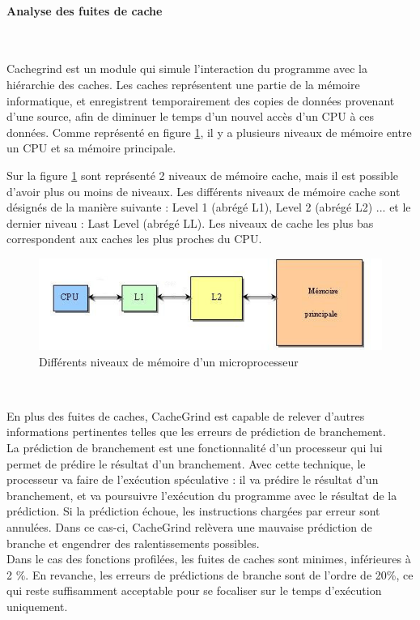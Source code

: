 \documentclass[10pt]{report}
\begin{document}
\paragraph{Analyse des fuites de cache}~\par
Cachegrind est un module qui simule l'interaction du programme avec la hiérarchie des caches. Les caches représentent une partie de la mémoire informatique, et enregistrent temporairement des copies de données provenant d'une source, afin de diminuer le temps d'un nouvel accès d'un CPU à ces données. Comme représenté en figure \ref{Différents niveaux de mémoire d'un microprocesseur}, il y a plusieurs niveaux de mémoire entre un CPU et sa mémoire principale. 

Sur la figure \ref{Différents niveaux de mémoire d'un microprocesseur} sont représenté 2 niveaux de mémoire cache, mais il est possible d'avoir plus ou moins de niveaux.
Les différents niveaux de mémoire cache sont désignés de la manière suivante : Level 1 (abrégé L1), Level 2 (abrégé L2) ... et le dernier niveau : Last Level (abrégé LL). Les niveaux de cache les plus bas correspondent aux caches les plus proches du CPU. 
\begin{figure}[h!]
	\begin{center}
		\includegraphics[width=13cm]{Reports/figures/Mem_hierarchy.jpg}
	\end{center}	
	\caption{Différents niveaux de mémoire d'un microprocesseur}
	\label{Différents niveaux de mémoire d'un microprocesseur}
\end{figure}~\par 
En plus des fuites de caches, CacheGrind est capable de relever d'autres informations pertinentes telles que les erreurs de prédiction de branchement.\\
La prédiction de branchement est une fonctionnalité d'un processeur qui lui permet de prédire le résultat d'un branchement. Avec cette technique, le processeur va faire de l’exécution spéculative : il va prédire le résultat d'un branchement, et va poursuivre l’exécution du programme avec le résultat de la prédiction. Si la prédiction échoue, les instructions chargées par erreur sont annulées. Dans ce cas-ci, CacheGrind relèvera une mauvaise prédiction de branche et engendrer des ralentissements possibles.\\
Dans le cas des fonctions profilées, les fuites de caches sont minimes, inférieures à 2 \%. En revanche, les erreurs de prédictions de branche sont de l'ordre de 20\%, ce qui reste suffisamment acceptable pour se focaliser sur le temps d'exécution uniquement.  
\newpage
\end{document}
